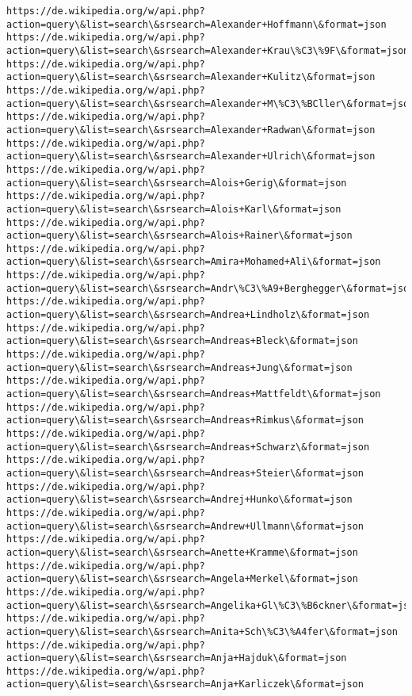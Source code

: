 \documentclass[11pt]{article}
\begin{document}
\begin{Verbatim}[commandchars=\\\{\}]
https://de.wikipedia.org/w/api.php?action=query\&list=search\&srsearch=Alexander+Hoffmann\&format=json
https://de.wikipedia.org/w/api.php?action=query\&list=search\&srsearch=Alexander+Krau\%C3\%9F\&format=json
https://de.wikipedia.org/w/api.php?action=query\&list=search\&srsearch=Alexander+Kulitz\&format=json
https://de.wikipedia.org/w/api.php?action=query\&list=search\&srsearch=Alexander+M\%C3\%BCller\&format=json
https://de.wikipedia.org/w/api.php?action=query\&list=search\&srsearch=Alexander+Radwan\&format=json
https://de.wikipedia.org/w/api.php?action=query\&list=search\&srsearch=Alexander+Ulrich\&format=json
https://de.wikipedia.org/w/api.php?action=query\&list=search\&srsearch=Alois+Gerig\&format=json
https://de.wikipedia.org/w/api.php?action=query\&list=search\&srsearch=Alois+Karl\&format=json
https://de.wikipedia.org/w/api.php?action=query\&list=search\&srsearch=Alois+Rainer\&format=json
https://de.wikipedia.org/w/api.php?action=query\&list=search\&srsearch=Amira+Mohamed+Ali\&format=json
https://de.wikipedia.org/w/api.php?action=query\&list=search\&srsearch=Andr\%C3\%A9+Berghegger\&format=json
https://de.wikipedia.org/w/api.php?action=query\&list=search\&srsearch=Andrea+Lindholz\&format=json
https://de.wikipedia.org/w/api.php?action=query\&list=search\&srsearch=Andreas+Bleck\&format=json
https://de.wikipedia.org/w/api.php?action=query\&list=search\&srsearch=Andreas+Jung\&format=json
https://de.wikipedia.org/w/api.php?action=query\&list=search\&srsearch=Andreas+Mattfeldt\&format=json
https://de.wikipedia.org/w/api.php?action=query\&list=search\&srsearch=Andreas+Rimkus\&format=json
https://de.wikipedia.org/w/api.php?action=query\&list=search\&srsearch=Andreas+Schwarz\&format=json
https://de.wikipedia.org/w/api.php?action=query\&list=search\&srsearch=Andreas+Steier\&format=json
https://de.wikipedia.org/w/api.php?action=query\&list=search\&srsearch=Andrej+Hunko\&format=json
https://de.wikipedia.org/w/api.php?action=query\&list=search\&srsearch=Andrew+Ullmann\&format=json
https://de.wikipedia.org/w/api.php?action=query\&list=search\&srsearch=Anette+Kramme\&format=json
https://de.wikipedia.org/w/api.php?action=query\&list=search\&srsearch=Angela+Merkel\&format=json
https://de.wikipedia.org/w/api.php?action=query\&list=search\&srsearch=Angelika+Gl\%C3\%B6ckner\&format=json
https://de.wikipedia.org/w/api.php?action=query\&list=search\&srsearch=Anita+Sch\%C3\%A4fer\&format=json
https://de.wikipedia.org/w/api.php?action=query\&list=search\&srsearch=Anja+Hajduk\&format=json
https://de.wikipedia.org/w/api.php?action=query\&list=search\&srsearch=Anja+Karliczek\&format=json

\end{Verbatim}
\end{document}
